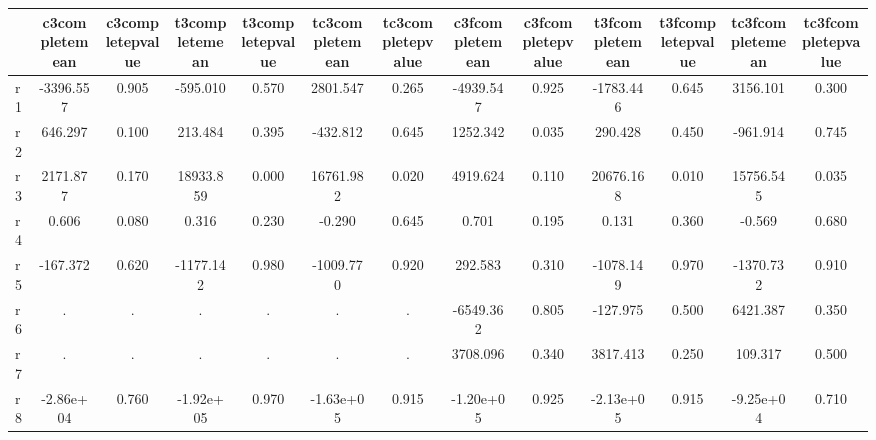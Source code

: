\begin{table}[htbp]
\begin{tabular}{lcccccccccccc} \hline \hline
 & c3completemean  & c3completepvalue  & t3completemean  & t3completepvalue  & tc3completemean  & tc3completepvalue  & c3fcompletemean  & c3fcompletepvalue  & t3fcompletemean  & t3fcompletepvalue  & tc3fcompletemean  & tc3fcompletepvalue  \\  \hline 
r1 & -3396.557 &     0.905 &  -595.010 &     0.570 &  2801.547 &     0.265 & -4939.547 &     0.925 & -1783.446 &     0.645 &  3156.101 &     0.300 \\  
r2 &   646.297 &     0.100 &   213.484 &     0.395 &  -432.812 &     0.645 &  1252.342 &     0.035 &   290.428 &     0.450 &  -961.914 &     0.745 \\  
r3 &  2171.877 &     0.170 & 18933.859 &     0.000 & 16761.982 &     0.020 &  4919.624 &     0.110 & 20676.168 &     0.010 & 15756.545 &     0.035 \\  
r4 &     0.606 &     0.080 &     0.316 &     0.230 &    -0.290 &     0.645 &     0.701 &     0.195 &     0.131 &     0.360 &    -0.569 &     0.680 \\  
r5 &  -167.372 &     0.620 & -1177.142 &     0.980 & -1009.770 &     0.920 &   292.583 &     0.310 & -1078.149 &     0.970 & -1370.732 &     0.910 \\  
r6 &         . &         . &         . &         . &         . &         . & -6549.362 &     0.805 &  -127.975 &     0.500 &  6421.387 &     0.350 \\  
r7 &         . &         . &         . &         . &         . &         . &  3708.096 &     0.340 &  3817.413 &     0.250 &   109.317 &     0.500 \\  
r8 & -2.86e+04 &     0.760 & -1.92e+05 &     0.970 & -1.63e+05 &     0.915 & -1.20e+05 &     0.925 & -2.13e+05 &     0.915 & -9.25e+04 &     0.710 \\  
\hline \hline \end{tabular}
\end{table}
